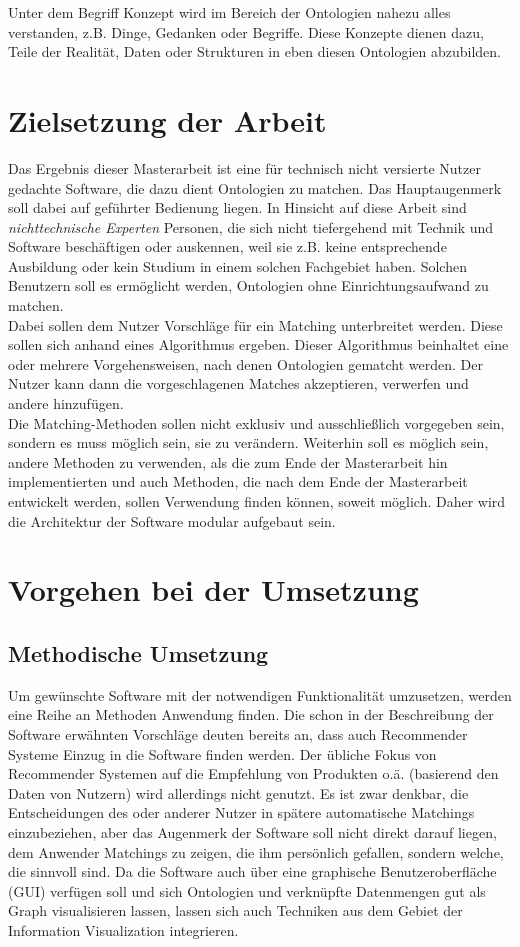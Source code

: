Unter dem Begriff Konzept wird im Bereich der Ontologien nahezu alles verstanden, z.B. Dinge, Gedanken oder Begriffe. \cite{Usc95}  Diese Konzepte dienen dazu, Teile der Realität, Daten oder Strukturen in eben diesen Ontologien abzubilden.

\section{Zielsetzung der Arbeit}
Das Ergebnis dieser Masterarbeit ist eine für technisch nicht versierte Nutzer
gedachte Software, die dazu dient Ontologien zu matchen. Das Hauptaugenmerk soll
dabei auf geführter Bedienung liegen. In Hinsicht auf diese Arbeit sind
\textit{nichttechnische Experten} Personen, die sich nicht tiefergehend mit
Technik und Software beschäftigen oder auskennen, weil sie z.B. keine
entsprechende Ausbildung oder kein Studium in einem solchen Fachgebiet haben.
Solchen Benutzern soll es ermöglicht werden, Ontologien ohne Einrichtungsaufwand
zu matchen.\\
Dabei sollen dem Nutzer Vorschläge für ein Matching unterbreitet werden. Diese
sollen sich anhand eines Algorithmus ergeben. Dieser Algorithmus beinhaltet eine oder mehrere Vorgehensweisen, nach denen Ontologien gematcht werden. Der Nutzer kann dann die vorgeschlagenen Matches akzeptieren, verwerfen und andere hinzufügen.\\
Die Matching-Methoden sollen nicht exklusiv und ausschließlich vorgegeben sein, sondern es muss möglich sein, sie zu verändern. Weiterhin soll es möglich sein, andere Methoden zu verwenden, als die zum Ende der Masterarbeit hin implementierten und auch Methoden, die nach dem Ende der Masterarbeit entwickelt werden, sollen Verwendung finden können, soweit möglich. Daher wird die Architektur der Software modular aufgebaut sein.

\section{Vorgehen bei der Umsetzung}

\subsection{Methodische Umsetzung}
Um gewünschte Software mit der notwendigen Funktionalität umzusetzen, werden eine Reihe an Methoden Anwendung finden. Die schon in der Beschreibung der Software erwähnten Vorschläge deuten bereits an, dass auch Recommender Systeme Einzug in die Software finden werden. Der übliche Fokus von Recommender Systemen auf die Empfehlung von Produkten o.ä. (basierend den Daten von Nutzern) wird allerdings nicht genutzt. Es ist zwar denkbar, die Entscheidungen des oder anderer Nutzer in spätere automatische Matchings einzubeziehen, aber das Augenmerk der Software soll nicht direkt darauf liegen, dem Anwender Matchings zu zeigen, die ihm persönlich gefallen, sondern welche, die sinnvoll sind. Da die Software auch über eine graphische Benutzeroberfläche (GUI) verfügen soll und sich Ontologien und verknüpfte Datenmengen gut als Graph visualisieren lassen, lassen sich auch Techniken aus dem Gebiet der Information Visualization integrieren.

